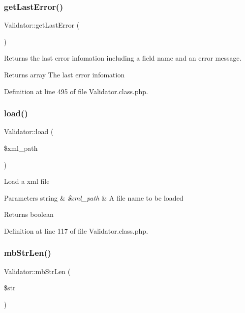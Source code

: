 \subsubsection{\texorpdfstring{get\+Last\+Error()}{getLastError()}}
{\footnotesize\ttfamily Validator\+::get\+Last\+Error (\begin{DoxyParamCaption}{ }\end{DoxyParamCaption})}

Returns the last error infomation including a field name and an error message. \begin{DoxyReturn}{Returns}
array The last error infomation 
\end{DoxyReturn}


Definition at line 495 of file Validator.\+class.\+php.

\hypertarget{classValidator_a43de0eb69cae01eee855f825324ffc39}{}\label{classValidator_a43de0eb69cae01eee855f825324ffc39} 
\subsubsection{\texorpdfstring{load()}{load()}}
{\footnotesize\ttfamily Validator\+::load (\begin{DoxyParamCaption}\item[{}]{\$xml\+\_\+path }\end{DoxyParamCaption})}

Load a xml file 
\begin{DoxyParams}[1]{Parameters}
string & {\em \$xml\+\_\+path} & A file name to be loaded \\
\hline
\end{DoxyParams}
\begin{DoxyReturn}{Returns}
boolean 
\end{DoxyReturn}


Definition at line 117 of file Validator.\+class.\+php.

\hypertarget{classValidator_a46de77869676b1b027a076c2106653e2}{}\label{classValidator_a46de77869676b1b027a076c2106653e2} 
\subsubsection{\texorpdfstring{mb\+Str\+Len()}{mbStrLen()}}
{\footnotesize\ttfamily Validator\+::mb\+Str\+Len (\begin{DoxyParamCaption}\item[{}]{\$str }\end{DoxyParamCaption})}

